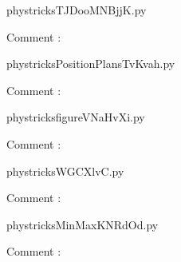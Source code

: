     \clearpage
    


    \newcommand{\CaptionFigTJDooMNBjjK}{<+Type your caption here+>}
    \begin{center}
        
    \end{center}
    phystricksTJDooMNBjjK.py

    Comment : 

    \clearpage
    


    \newcommand{\CaptionFigPositionPlansTvKvah}{<+Type your caption here+>}
    \begin{center}
        
    \end{center}
    phystricksPositionPlansTvKvah.py

    Comment : 

    \clearpage
    


    \newcommand{\CaptionFigfigureVNaHvXi}{<+Type your caption here+>}
    \begin{center}
        
    \end{center}
    phystricksfigureVNaHvXi.py

    Comment : 

    \clearpage
    


    \newcommand{\CaptionFigWGCXlvC}{<+Type your caption here+>}
    \begin{center}
        
    \end{center}
    phystricksWGCXlvC.py

    Comment : 

    \clearpage
    


    \newcommand{\CaptionFigMinMaxKNRdOd}{<+Type your caption here+>}
    \begin{center}
        
    \end{center}
    phystricksMinMaxKNRdOd.py

    Comment : 

    \clearpage
    


